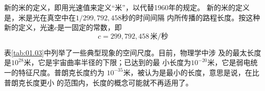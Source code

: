 \noindent 新的米的定义，即用光速值来定义“米”，以代替1960年的规定。
新的米的定义是，米是光在真空中在$ 1/299,792,458 $秒的时间间隔
内所传播的路程长度。按这种新的定义，光速$ c $是一固定的常数，即
\begin{equation*}
  c = 299,792,458 \, \text{米/秒}
\end{equation*}

表\ref{tab:01.03}中列举了一些典型现象的空间尺度。目前，物理学中涉
及的最太长度是$10^{28}$米，它是宇宙曲率半径的下限；已达到的最
小长度为$10^{-20}$米，它是弱电统一的特征尺度。普朗克长度约为
$10^{-35}$米，被认为是最小的长度，意思是说，在比普朗克长度更小
的范围内，长度的概念可能就不再适用了。
